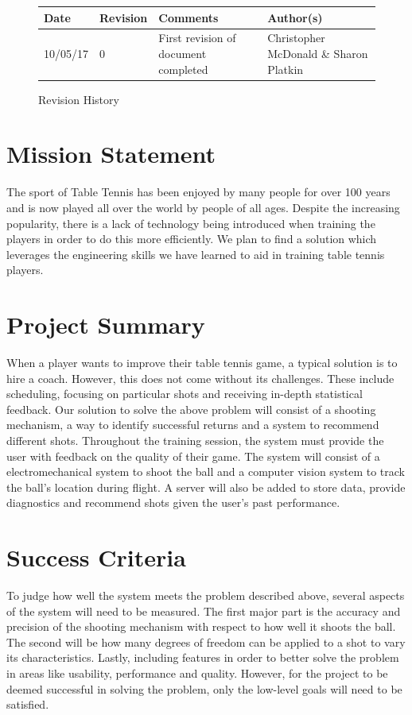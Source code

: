\documentclass[11pt]{article}
\begin{document}
\tableofcontents
\listoffigures

\vfill
\begin{figure}[htbp]
   \centering
   \noindent\begin{tabularx}{\textwidth}{|l|l|X|l|}
   \hline 
   \textbf{Date} & \textbf{Revision} & \textbf{Comments} & \textbf{Author(s)} \\
   \hline 
   10/05/17 & 0 & First revision of document completed & Christopher McDonald \& Sharon Platkin \\
   \hline
   \end{tabularx}
   \caption{Revision History}
\end{figure}

\newpage
\section{Mission Statement}
The sport of Table Tennis has been enjoyed by many people for over 100 years and is now played all over the world by people of all ages. Despite the increasing popularity, there is a lack of technology being introduced when training the players in order to do this more efficiently. We plan to find a solution which leverages the engineering skills we have learned to aid in training table tennis players.
\section{Project Summary}
When a player wants to improve their table tennis game, a typical solution is to hire a coach. However, this does not come without its challenges. These include scheduling, focusing on particular shots and receiving in-depth statistical feedback.
Our solution to solve the above problem will consist of a shooting mechanism, a way to identify successful returns and a system to recommend different shots. Throughout the training session, the system must provide the user with feedback on the quality of their game.
The system will consist of a electromechanical system to shoot the ball and a computer vision system to track the ball's location during flight. A server will also be added to store data, provide diagnostics and recommend shots given the user's past performance.
\section{Success Criteria}
To judge how well the system meets the problem described above, several aspects of the system will need to be measured. The first major part is the accuracy and precision of the shooting mechanism with respect to how well it shoots the ball. The second will be how many degrees of freedom can be applied to a shot to vary its characteristics. Lastly, including features in order to better solve the problem in areas like usability, performance and quality. However, for the project to be deemed successful in solving the problem, only the low-level goals will need to be satisfied. 
\end{document}
